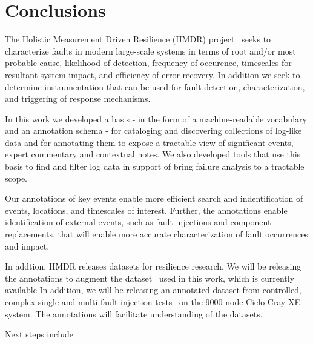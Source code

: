 \section{Conclusions}
\label{s:conclusion}

The Holistic Measurement Driven Resilience (HMDR) project~\cite{HMDRweb}
seeks to characterize faults in modern large-scale systems
in terms of root and/or most probable cause, likelihood
of detection, frequency of occurence, timescales for
resultant system impact, and efficiency of error recovery.
In addition we seek to determine instrumentation that can be used for
fault detection, characterization, and triggering
of response mechanisms.

In this work we developed a basis - in the form of a machine-readable 
vocabulary and an annotation schema - for cataloging and discovering 
collections of log-like data and for annotating them to expose 
a tractable view of significant events, expert commentary and 
contextual notes. We also developed tools that use this basis
to find and filter log data in support of bring failure analysis to 
a tractable scope.

Our annotations of key events enable
more efficient search and indentification of
events, locations, and timescales of interest.
Further, the annotations enable identification
of external events, such as fault injections
and component replacements, that will enable
more accurate characterization of fault occurrences
and impact.

In addtion, HMDR releases datasets for resilience research.
We will be releasing the annotations to augment the dataset~\cite{Mutrino3mo} used in this
work, which is currently available
In addition, we will be releasing an annotated dataset from controlled, complex single
and multi fault injection tests~\cite{CieloFICUG2017} on the 9000 node Cielo Cray XE system.
The annotations will facilitate understanding
of the datasets.


Next steps include 





